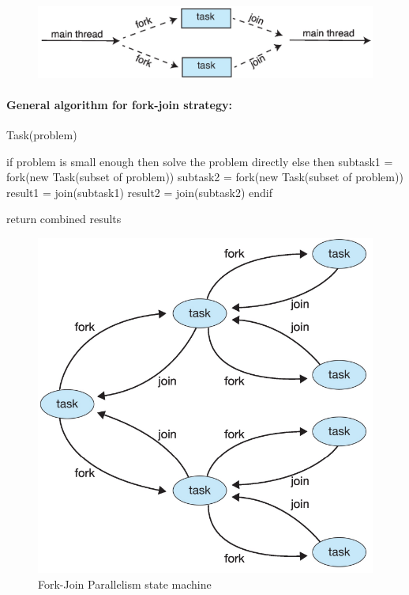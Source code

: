 \begin{figure}[htbp]
    \centering
    \includegraphics[width=0.7\linewidth]{img/fork_join.png}
\end{figure}

\paragraph{General algorithm for fork-join strategy:}

\begin{codeInC}
Task(problem)   

if problem is small enough 
    then 
        solve the problem directly 
else
    then
        subtask1 = fork(new Task(subset of problem))                
        subtask2 = fork(new Task(subset of problem))                
        result1 = join(subtask1)                                        
        result2 = join(subtask2)   
endif

return combined results                                    

\end{codeInC}

\begin{figure}[htbp]
    \centering
    \includegraphics[width=0.5\linewidth]{img/F_J_parall.png}
    \caption{Fork-Join Parallelism state machine}    
\end{figure}





